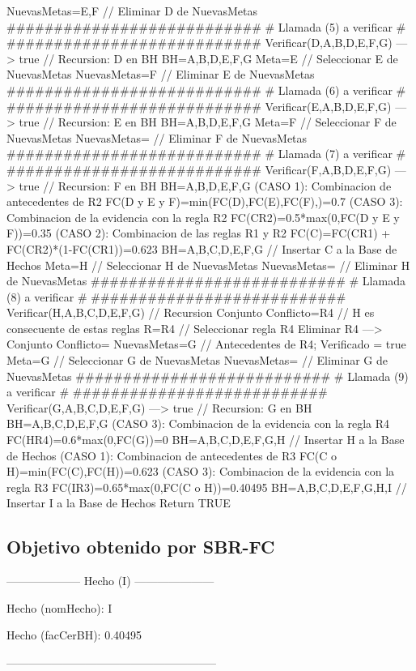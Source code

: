 \begin{listing}[language=Pascal]
	NuevasMetas={E,F} // Eliminar D de NuevasMetas
  ###########################
  # Llamada (5) a verificar #
  ###########################
	Verificar(D,{A,B,D,E,F,G}) ---> true // Recursion: D en BH
	BH={A,B,D,E,F,G}
	Meta=E // Seleccionar E de NuevasMetas
	NuevasMetas={F} // Eliminar E de NuevasMetas
  ###########################
  # Llamada (6) a verificar #
  ###########################
	Verificar(E,{A,B,D,E,F,G}) ---> true // Recursion: E en BH
	BH={A,B,D,E,F,G}
	Meta=F // Seleccionar F de NuevasMetas
	NuevasMetas={} // Eliminar F de NuevasMetas
  ###########################
  # Llamada (7) a verificar #
  ###########################
	Verificar(F,{A,B,D,E,F,G}) ---> true // Recursion: F en BH
	BH={A,B,D,E,F,G}
	(CASO 1): Combinacion de antecedentes de R2
	 FC(D y E y F)=min(FC(D),FC(E),FC(F),)=0.7
	(CASO 3): Combinacion de la evidencia con la regla R2
	 FC(C{R2})=0.5*max(0,FC(D y E y F))=0.35
	(CASO 2): Combinacion de las reglas R1 y R2
	 FC(C)=FC(C{R1}) + FC(C{R2})*(1-FC(C{R1}))=0.623
	BH={A,B,C,D,E,F,G} // Insertar C a la Base de Hechos
	Meta=H // Seleccionar H de NuevasMetas
	NuevasMetas={} // Eliminar H de NuevasMetas
  ###########################
  # Llamada (8) a verificar #
  ###########################
	Verificar(H,{A,B,C,D,E,F,G}) // Recursion 
	Conjunto Conflicto={R4} // H es consecuente de estas reglas
	R={R4} // Seleccionar regla R4
	Eliminar R4 ---> Conjunto Conflicto={}
	NuevasMetas={G} // Antecedentes de R4; Verificado = true
	Meta=G // Seleccionar G de NuevasMetas
	NuevasMetas={} // Eliminar G de NuevasMetas
  ###########################
  # Llamada (9) a verificar #
  ###########################
	Verificar(G,{A,B,C,D,E,F,G}) ---> true // Recursion: G en BH
	BH={A,B,C,D,E,F,G}
	(CASO 3): Combinacion de la evidencia con la regla R4
	 FC(H{R4})=0.6*max(0,FC(G))=0
	BH={A,B,C,D,E,F,G,H} // Insertar H a la Base de Hechos
	(CASO 1): Combinacion de antecedentes de R3
	 FC(C o H)=min(FC(C),FC(H))=0.623
	(CASO 3): Combinacion de la evidencia con la regla R3
	 FC(I{R3})=0.65*max(0,FC(C o H))=0.40495
	BH={A,B,C,D,E,F,G,H,I} // Insertar I a la Base de Hechos
Return TRUE	
\end{listing}

\subsection{Objetivo obtenido por SBR-FC}
\begin{center}
\par -------------------- Hecho (I) ---------------------
\par Hecho (nomHecho): I
\par Hecho (facCerBH): 0.40495
\par --------------------------------------------------------
\end{center}


